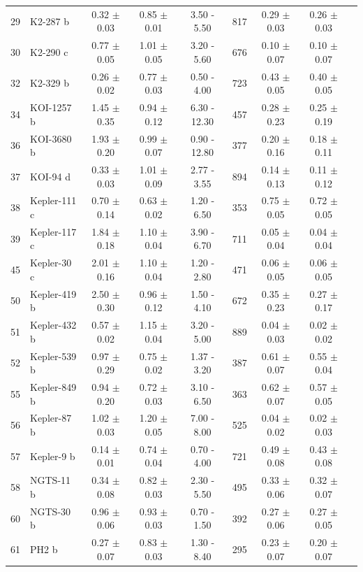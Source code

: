 \begin{longtable}{llccccccc}
29 & K2-287 b & 0.32 $\pm$ 0.03 & 0.85 $\pm$ 0.01 & 3.50 - 5.50 & 817 & 0.29 $\pm$ 0.03 & 0.26 $\pm$ 0.03 \\
30 & K2-290 c & 0.77 $\pm$ 0.05 & 1.01 $\pm$ 0.05 & 3.20 - 5.60 & 676 & 0.10 $\pm$ 0.07 & 0.10 $\pm$ 0.07 \\
32 & K2-329 b & 0.26 $\pm$ 0.02 & 0.77 $\pm$ 0.03 & 0.50 - 4.00 & 723 & 0.43 $\pm$ 0.05 & 0.40 $\pm$ 0.05 \\
34 & KOI-1257 b & 1.45 $\pm$ 0.35 & 0.94 $\pm$ 0.12 & 6.30 - 12.30 & 457 & 0.28 $\pm$ 0.23 & 0.25 $\pm$ 0.19 \\
36 & KOI-3680 b & 1.93 $\pm$ 0.20 & 0.99 $\pm$ 0.07 & 0.90 - 12.80 & 377 & 0.20 $\pm$ 0.16 & 0.18 $\pm$ 0.11 \\
37 & KOI-94 d & 0.33 $\pm$ 0.03 & 1.01 $\pm$ 0.09 & 2.77 - 3.55 & 894 & 0.14 $\pm$ 0.13 & 0.11 $\pm$ 0.12 \\
38 & Kepler-111 c & 0.70 $\pm$ 0.14 & 0.63 $\pm$ 0.02 & 1.20 - 6.50 & 353 & 0.75 $\pm$ 0.05 & 0.72 $\pm$ 0.05 \\
39 & Kepler-117 c & 1.84 $\pm$ 0.18 & 1.10 $\pm$ 0.04 & 3.90 - 6.70 & 711 & 0.05 $\pm$ 0.04 & 0.04 $\pm$ 0.04 \\
45 & Kepler-30 c & 2.01 $\pm$ 0.16 & 1.10 $\pm$ 0.04 & 1.20 - 2.80 & 471 & 0.06 $\pm$ 0.05 & 0.06 $\pm$ 0.05 \\
50 & Kepler-419 b & 2.50 $\pm$ 0.30 & 0.96 $\pm$ 0.12 & 1.50 - 4.10 & 672 & 0.35 $\pm$ 0.23 & 0.27 $\pm$ 0.17 \\
51 & Kepler-432 b & 0.57 $\pm$ 0.02 & 1.15 $\pm$ 0.04 & 3.20 - 5.00 & 889 & 0.04 $\pm$ 0.03 & 0.02 $\pm$ 0.02 \\
52 & Kepler-539 b & 0.97 $\pm$ 0.29 & 0.75 $\pm$ 0.02 & 1.37 - 3.20 & 387 & 0.61 $\pm$ 0.07 & 0.55 $\pm$ 0.04 \\
55 & Kepler-849 b & 0.94 $\pm$ 0.20 & 0.72 $\pm$ 0.03 & 3.10 - 6.50 & 363 & 0.62 $\pm$ 0.07 & 0.57 $\pm$ 0.05 \\
56 & Kepler-87 b & 1.02 $\pm$ 0.03 & 1.20 $\pm$ 0.05 & 7.00 - 8.00 & 525 & 0.04 $\pm$ 0.02 & 0.02 $\pm$ 0.03 \\
57 & Kepler-9 b & 0.14 $\pm$ 0.01 & 0.74 $\pm$ 0.04 & 0.70 - 4.00 & 721 & 0.49 $\pm$ 0.08 & 0.43 $\pm$ 0.08 \\
58 & NGTS-11 b & 0.34 $\pm$ 0.08 & 0.82 $\pm$ 0.03 & 2.30 - 5.50 & 495 & 0.33 $\pm$ 0.06 & 0.32 $\pm$ 0.07 \\
60 & NGTS-30 b & 0.96 $\pm$ 0.06 & 0.93 $\pm$ 0.03 & 0.70 - 1.50 & 392 & 0.27 $\pm$ 0.06 & 0.27 $\pm$ 0.05 \\
61 & PH2 b & 0.27 $\pm$ 0.07 & 0.83 $\pm$ 0.03 & 1.30 - 8.40 & 295 & 0.23 $\pm$ 0.07 & 0.20 $\pm$ 0.07 \\

\end{longtable}
